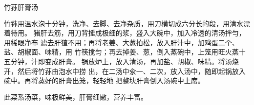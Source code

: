 \begin{recipe}{竹荪肝膏汤}

\ingredients


\cooking

\step 竹荪用温水泡十分钟，洗净、去脚、去净杂质，用刀横切成六分长的段，用清水漂
着待用。
\step 猪肝去筋，用刀背捶成极细的浆，盛入大碗中，加入冷透的清汤拌勻，用稀眼净布
滤去肝猹不用；再将老姜、大葱拍松，放入肝汁中，加鸡蛋二个、盐、胡椒面、味精，用
竹筷搅匀；再去掉姜、葱，倒入蒸碗中，上笼用旺火蒸十五分钟，汁即变成肝膏。
\step 锅放炉上，放入清汤，再加盐、胡椒、味精。将汤烧开，然后将竹荪由泡水中捞
出，在二汤中汆一、二次，放入汤中，随即起锅放入碗中。再将蒸好的肝膏出笼，轻轻地
把整块肝膏倒入汤碗中上席。

\notes

此菜系汤菜，味极鲜美，肝膏细嫩，营养丰富。

\end{recipe}

